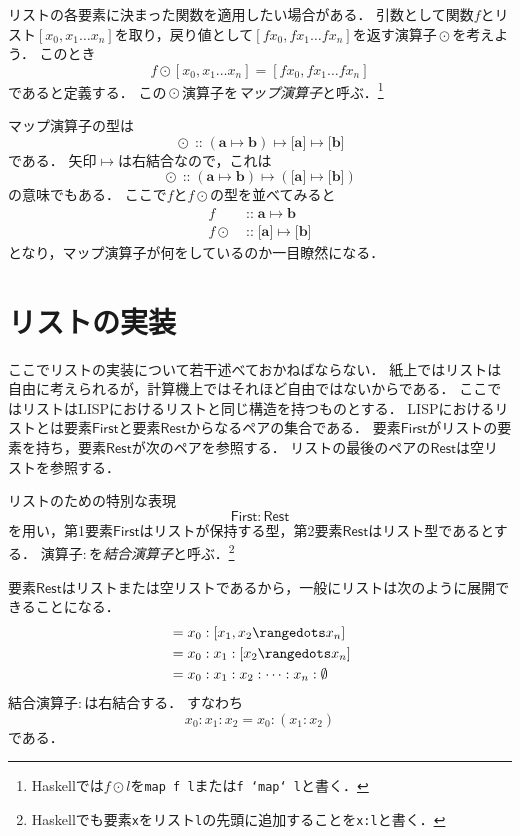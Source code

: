 \documentclass[twocolumn]{jsbook}
\newcommand{\keyword}[1]{\emph{#1}}
\newcommand{\code}[1]{\texttt{#1}}
\newcommand{\hsklType}[1]{\textbf{#1}}
\DeclareMathOperator{\hsklMap}{\odot}
\DeclareMathOperator{\hsklOf}{::}
\newcommand{\hsklEmptyList}{\emptyset}
\newcommand{\hsklListType}[1]{\boldsymbol{[}#1\boldsymbol{]}}
\newcommand{\mathVarKeyword}[1]{\mathsf{#1}}
\DeclareMathOperator{\mathIn}{::}
\DeclareMathOperator{\mathMapsTo}{\mapsto}
\newcommand{\mathFirst}{\mathVarKeyword{First}}
\newcommand{\mathRest}{\mathVarKeyword{Rest}}
\newcommand{\mathMorph}[2]{#1\mathMapsTo#2}
\newcommand{\mathMorphII}[3]{#1\mathMapsTo#2\mathMapsTo#3}
\begin{document}
リストの各要素に決まった関数を適用したい場合がある．
引数として関数$f$とリスト$[x_0,x_1\dots x_n]$を取り，戻り値として$[fx_0,fx_1\dots fx_n]$を返す演算子$\hsklMap$を考えよう．
このとき$$f\hsklMap[x_0,x_1\dots x_n]=[fx_0,fx_1\dots fx_n]$$であると定義する．
この$\hsklMap$演算子を\keyword{マップ演算子}と呼ぶ．\footnote{Haskellでは$f\hsklMap l$を\code{map f l}または\code{f `map` l}と書く．}

マップ演算子の型は
$$\hsklMap\hsklOf{}\mathMorphII{(\mathMorph{\hsklType{a}}{\hsklType{b}})}{\hsklListType{\hsklType{a}}}{\hsklListType{\hsklType{b}}}$$
である．
矢印$\mathMapsTo$は右結合なので，これは$$\hsklMap\hsklOf{}\mathMorph{(\mathMorph{\hsklType{a}}{\hsklType{b}})}{(\mathMorph{\hsklListType{\hsklType{a}}}{\hsklListType{\hsklType{b}}})}$$の意味でもある．
ここで$f$と$f\hsklMap$の型を並べてみると
\begin{align*}
f&\mathIn\mathMorph{\hsklType{a}}{\hsklType{b}}\\
f\hsklMap&\mathIn\mathMorph{\hsklListType{\hsklType{a}}}{\hsklListType{\hsklType{b}}}
\end{align*}
となり，マップ演算子が何をしているのか一目瞭然になる．

\section{リストの実装}

ここでリストの実装について若干述べておかねばならない．
紙上ではリストは自由に考えられるが，計算機上ではそれほど自由ではないからである．
ここではリストはLISPにおけるリストと同じ構造を持つものとする．
LISPにおけるリストとは要素$\mathFirst$と要素$\mathRest$からなるペアの集合である．
要素$\mathFirst$がリストの要素を持ち，要素$\mathRest$が次のペアを参照する．
リストの最後のペアの$\mathRest$は空リストを参照する．

リストのための特別な表現$$\mathFirst:\mathRest$$を用い，第1要素$\mathFirst$はリストが保持する型，第2要素$\mathRest$はリスト型であるとする．
演算子$:$を\keyword{結合演算子}と呼ぶ．\footnote{Haskellでも要素\code{x}をリスト\code{l}の先頭に追加することを\code{x:l}と書く．}

要素$\mathRest$はリストまたは空リストであるから，一般にリストは次のように展開できることになる．
\begin{align*}
[x_0,x_1,x_2\rangedots x_n]&=x_0:[x_1,x_2\rangedots x_n]\\
&=x_0:x_1:[x_2\rangedots x_n]\\
&=x_0:x_1:x_2:\dots:x_n:\hsklEmptyList
\end{align*}
結合演算子$:$は右結合する．
すなわち$$x_0:x_1:x_2=x_0:(x_1:x_2)$$である．
\end{document}
